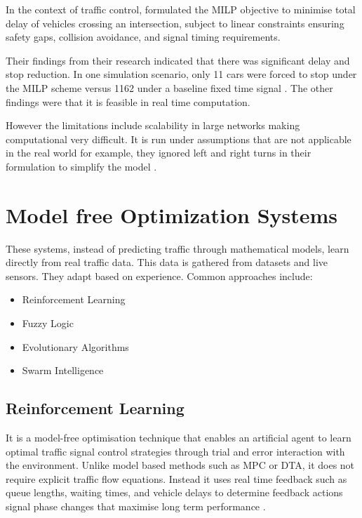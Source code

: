 ﻿\documentclass[11pt, a4paper]{report}
\begin{document}
In the context of traffic control, \cite{ye2019survey} formulated the MILP objective to minimise total delay of vehicles crossing an intersection, subject to linear constraints ensuring safety gaps, collision avoidance, and signal timing requirements.

Their findings from their research indicated that there was significant delay and stop reduction. In one simulation scenario, only 11 cars were forced to stop under the MILP scheme versus 1162 under a baseline fixed time signal \cite{ye2019survey}. The other findings were that it is feasible in real time computation.

However the limitations include scalability in large networks making computational very difficult. It is run under assumptions that are not applicable in the real world for example, they ignored left and right turns in their formulation to simplify the model \cite{ye2019survey}.

\section{Model free Optimization Systems}

These systems, instead of predicting traffic through mathematical models, learn directly from real traffic data. This data is gathered from datasets and live sensors. They adapt based on experience. Common approaches include:

\begin{itemize}
    \item Reinforcement Learning
    \item Fuzzy Logic
    \item Evolutionary Algorithms
    \item Swarm Intelligence
\end{itemize}

\subsection{Reinforcement Learning}

It is a model-free optimisation technique that enables an artificial agent to learn optimal traffic signal control strategies through trial and error interaction with the environment. Unlike model based methods such as MPC or DTA, it does not require explicit traffic flow equations. Instead it uses real time feedback such as queue lengths, waiting times, and vehicle delays to determine feedback actions signal phase changes that maximise long term performance \cite{futuretransp5040137}.
\end{document}
